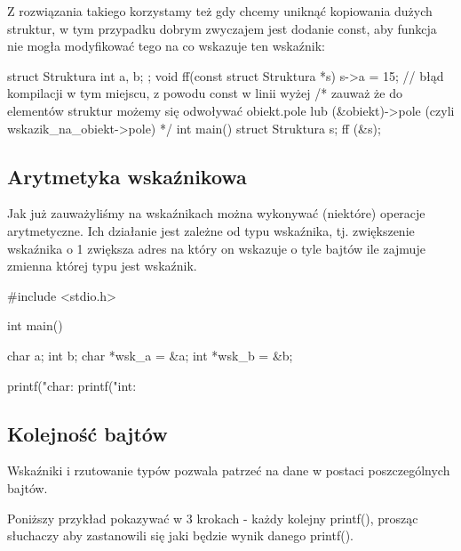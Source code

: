 Z rozwiązania takiego korzystamy też gdy chcemy uniknąć kopiowania dużych struktur, w tym przypadku dobrym zwyczajem jest dodanie const, aby funkcja nie mogła modyfikować tego na co wskazuje ten wskaźnik:

\begin{CodeFrame*}[c]{}
struct Struktura {
  int a, b;
};
void ff(const struct Struktura *s) {
    s->a = 15; // błąd kompilacji w tym miejscu, z powodu const w linii wyżej
    /* zauważ że do elementów struktur możemy się odwoływać
       obiekt.pole lub (&obiekt)->pole (czyli wskazik_na_obiekt->pole) */
}
int main() {
    struct Struktura s;
    ff (&s);
}
\end{CodeFrame*}


\subsection{Arytmetyka wskaźnikowa}

Jak już zauważyliśmy na wskaźnikach można wykonywać (niektóre) operacje arytmetyczne. Ich działanie jest zależne od typu wskaźnika, tj. zwiększenie wskaźnika o 1 zwiększa adres na który on wskazuje o tyle bajtów ile zajmuje zmienna której typu jest wskaźnik.

\begin{CodeFrame*}[c]{}
#include <stdio.h>

int main() {
    char a;    int    b;
    char *wsk_a = &a;
    int    *wsk_b = &b;
    
    printf("char: %
    printf("int:    %
}
\end{CodeFrame*}

\subsection{Kolejność bajtów}

Wskaźniki i rzutowanie typów pozwala patrzeć na dane w postaci poszczególnych bajtów.

\begin{teacherOnly}
Poniższy przykład pokazywać w 3 krokach - każdy kolejny printf(), prosząc słuchaczy aby zastanowili się jaki będzie wynik danego printf().
\end{teacherOnly}

